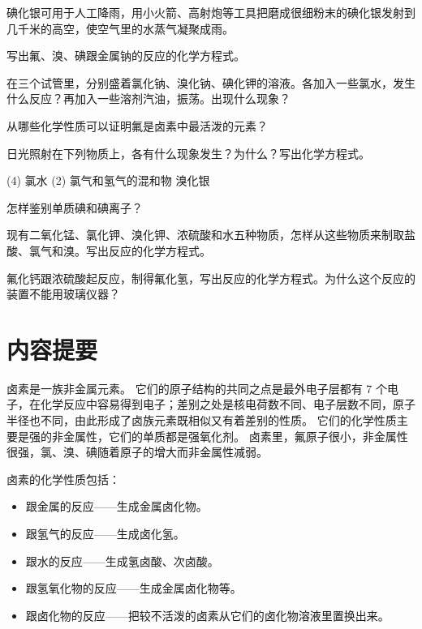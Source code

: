 碘化银可用于人工降雨，用小火箭、高射炮等工具把磨成很细粉末的碘化银发射到几千米的高空，使空气里的水蒸气凝聚成雨。

\begin{Practice}[习题]
  \begin{question}
    \item 写出氟、溴、碘跟金属钠的反应的化学方程式。
    \item 在三个试管里，分别盛着氯化钠、溴化钠、碘化钾的溶液。各加入一些氯水，发生什么反应？再加入一些溶剂汽油，振荡。出现什么现象？
    \item 从哪些化学性质可以证明氟是卤素中最活泼的元素？
    \item 日光照射在下列物质上，各有什么现象发生？为什么？写出化学方程式。
    \begin{tasks}(4)
      \task 氯水
      \task*(2) 氯气和氢气的混和物
      \task 溴化银
    \end{tasks} 
    \item 怎样鉴别单质碘和碘离子？
    \item 现有二氧化锰、氯化钾、溴化钾、浓硫酸和水五种物质，怎样从这些物质来制取盐酸、氯气和溴。写出反应的化学方程式。
    \item 氟化钙跟浓硫酸起反应，制得氟化氢，写出反应的化学方程式。为什么这个反应的装置不能用玻璃仪器？
  \end{question}
\end{Practice}

\section*{内容提要}
\setcounter{subsection}{0}
卤素是一族非金属元素。
它们的原子结构的共同之点是最外电子层都有 7 个电子，在化学反应中容易得到电子；差别之处是核电荷数不同、电子层数不同，原子半径也不同，由此形成了卤族元素既相似又有着差别的性质。
它们的化学性质主要是强的非金属性，它们的单质都是强氧化剂。
卤素里，氟原子很小，非金属性很强，氯、溴、碘随着原子的增大而非金属性减弱。

卤素的化学性质包括：
\begin{itemize}
  \item 跟金属的反应——生成金属卤化物。
  \item 跟氢气的反应——生成卤化氢。
  \item 跟水的反应——生成氢卤酸、次卤酸。
  \item 跟氢氧化物的反应——生成金属卤化物等。
  \item 跟卤化物的反应——把较不活泼的卤素从它们的卤化物溶液里置换出来。
\end{itemize}

